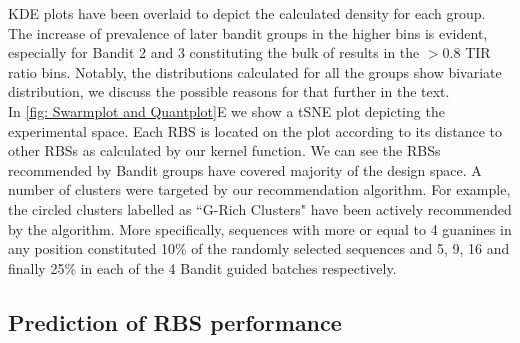 \documentclass{article}
\begin{document}
KDE plots have been overlaid to depict the calculated density for each group.
The increase of prevalence of later bandit groups in the higher bins is evident, especially for Bandit 2 and 3 constituting the bulk of results in the $>0.8$ TIR ratio bins.
Notably, the distributions calculated for all the groups show bivariate distribution, we discuss the possible reasons for that further in the text.\\
In \ref{fig: Swarmplot and Quantplot}E we show a tSNE plot depicting the experimental space.
Each RBS is located on the plot according to its distance to other RBSs as calculated by our kernel function.
We can see the RBSs recommended by Bandit groups have covered majority of the design space. 
A number of clusters were targeted by our recommendation algorithm.
For example, the circled clusters labelled as ``G-Rich Clusters" have been actively recommended by the algorithm.
More specifically, sequences with more or equal to 4 guanines in any position constituted 10\% of the randomly selected sequences and 5, 9, 16 and finally 25\% in each of the 4 Bandit guided batches respectively.

\subsection{Prediction of RBS performance}
\end{document}
